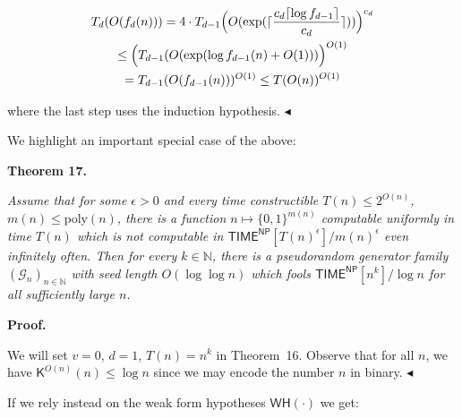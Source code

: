 \documentclass[10pt,a4paper]{article}
\begin{document}
\[\begin{gathered}
\displaystyle T_{d}(O(f_{d}(n)))=4\cdot T_{d-1}\Bigl{(}O(\exp(\lceil\frac{c_{d}\lceil\log f_{d-1}\rceil}{c_{d}}\rceil))\Bigr{)}^{c_{d}} \\
\displaystyle\leq\Bigl{(}T_{d-1}(O(\exp(\log f_{d-1}(n)+O(1)))\Bigr{)}^{O(1)} \\
\displaystyle=T_{d-1}(O(f_{d-1}(n)))^{O(1)}\leq T(O(n))^{O(1)}
\end{gathered}\]


where the last step uses the induction hypothesis.
$\blacktriangleleft$\par




We highlight an important special case of the above:\par





\par\medskip\noindent\textbf{
\textbf{Theorem 17}\textbf{.}
}\par



\emph{Assume that for some $\epsilon>0$ and every time constructible $T(n)\leq 2^{O(n)}$, $m(n)\leq\mathrm{poly}(n)$, there is a function $n\mapsto\{0,1\}^{m(n)}$ computable uniformly in time $T(n)$ which is not computable in ${\mathsf{TIME}}^{\mathsf{NP}}[T(n)^{\epsilon}]/m(n)^{\epsilon}$ even infinitely often. Then for every $k\in\mathbb{N}$, there is a pseudorandom generator family $(\mathcal{G}_{n})_{n\in\mathbb{N}}$ with seed length $O(\log\log n)$ which fools ${\mathsf{TIME}}^{{\mathsf{NP}}}[n^{k}]/\log n$ for all sufficiently large $n$.}\par







\par\medskip\noindent\textbf{Proof.}\par




We will set $v=0$, $d=1$, $T(n)=n^{k}$ in Theorem 16. Observe that for all $n$, we have ${\mathsf{K}}^{O(n)}(n)\leq\log n$ since we may encode the number $n$ in binary.
$\blacktriangleleft$\par




If we rely instead on the weak form hypotheses $\mathsf{WH}(\cdot)$ we get:\par
\end{document}
